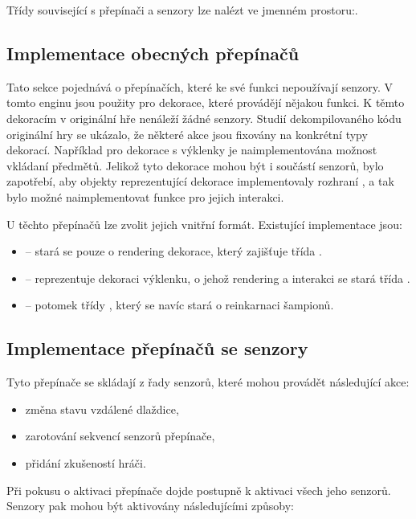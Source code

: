 Třídy související s přepínači a senzory lze nalézt ve jmenném prostoru:\newline {}.

\subsection{Implementace obecných přepínačů}\label{general-sensors}
Tato sekce pojednává o přepínačích, které ke své funkci nepoužívají senzory. V tomto enginu jsou použity pro 
dekorace, které provádějí nějakou funkci. K těmto dekoracím v originální hře nenáleží žádné senzory. 
Studií dekompilovaného kódu originální hry \cite{DMDecompilation} se ukázalo, že některé akce jsou fixovány 
na konkrétní typy dekorací. Například pro dekorace s výklenky je naimplementována možnost vkládaní předmětů.
Jelikož tyto dekorace mohou být i součástí senzorů, bylo zapotřebí, aby objekty reprezentující dekorace
implementovaly rozhraní , a tak bylo možné naimplementovat funkce pro jejich interakci.

U těchto přepínačů lze zvolit jejich vnitřní formát. Existující implementace jsou:
\begin{itemize}
\item {} -- stará se pouze o rendering dekorace, který zajišťuje třída . 
\item {} -- reprezentuje dekoraci výklenku, o jehož rendering a interakci se stará třída . 
\item {} -- potomek třídy , který se navíc stará o reinkarnaci šampionů.
\end{itemize}

\subsection{Implementace přepínačů se senzory}
Tyto přepínače se skládají z řady senzorů, které mohou provádět následující akce:

\begin{itemize}
\item změna stavu vzdálené dlaždice,
\item zarotování sekvencí senzorů přepínače,
\item přidání zkušeností hráči.
\end{itemize}

Při pokusu o aktivaci přepínače dojde postupně k aktivaci všech jeho senzorů.
Senzory pak mohou být aktivovány následujícími způsoby:

